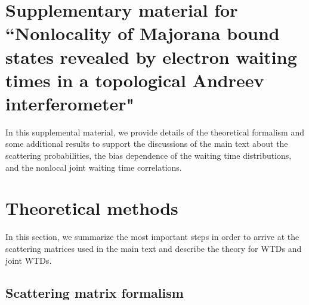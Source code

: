 \documentclass[aps,prl,amsmath,twocolumn,floatfix,superscriptaddress,longbibliography,footinbib]{revtex4-1}
\begin{document}


%

\clearpage

%
%
\onecolumngrid
%
%
\setcounter{equation}{0}
\renewcommand{\theequation}{S\,\arabic{equation}}
\setcounter{figure}{0}
\renewcommand{\thefigure}{S\,\arabic{figure}}
%
%
\section{Supplementary material for ``Nonlocality of Majorana bound states revealed by electron waiting times in a topological Andreev interferometer"}

In this supplemental material, we provide details of the theoretical formalism and some additional results to support the discussions of the main text about the scattering probabilities, the bias dependence of the waiting time distributions, and the nonlocal joint waiting time correlations. 

\section{Theoretical methods} \label{sec:App-method}

In this section, we summarize the most important steps in order to arrive at the scattering matrices used in the main text and describe the theory for WTDs and joint WTDs.

\subsection{Scattering matrix formalism\label{apnd1}}
\end{document}
